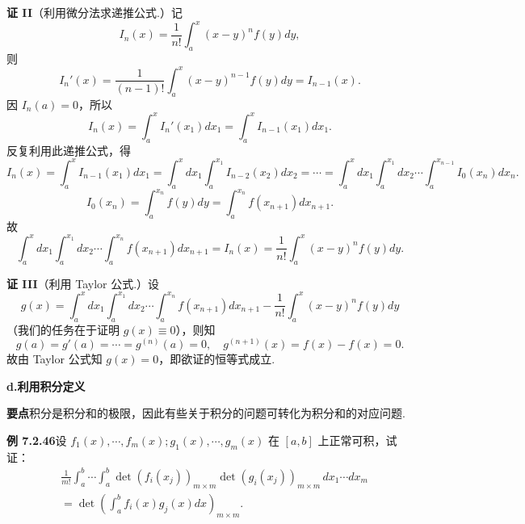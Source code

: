 \documentclass[UTF8, 12pt, fontset=fandol, oneside]{ctexart}
\begin{document}
\noindent\textbf{证 II}\quad （利用微分法求递推公式.）记
\[
I_n(x)=\frac1{n!}\int_a^x(x-y)^nf(y)dy,
\]
则
\[
I_n'(x)=\frac1{(n-1)!}\int_a^x(x-y)^{n-1}f(y)dy=I_{n-1}(x).
\]
因 $I_n(a)=0$，所以
\[
I_n(x)=\int_a^x I_n'(x_1)dx_1=\int_a^x I_{n-1}(x_1)dx_1.
\]
反复利用此递推公式，得
\[
I_n(x)=\int_a^x I_{n-1}(x_1)dx_1
=\int_a^x dx_1\int_a^{x_1}I_{n-2}(x_2)dx_2
=\cdots=\int_a^x dx_1\int_a^{x_1}dx_2\cdots
\int_a^{x_{n-1}}I_0(x_n)dx_n.
\]
\[
I_0(x_n)=\int_a^{x_n}f(y)dy=\int_a^{x_n}f(x_{n+1})dx_{n+1}.
\]
故
\[
\int_a^x dx_1\int_a^{x_1}dx_2\cdots\int_a^{x_n}f(x_{n+1})dx_{n+1}
=I_n(x)=\frac1{n!}\int_a^x(x-y)^nf(y)dy.
\]

\noindent\textbf{证 III}\quad （利用 Taylor 公式.）设
\[
g(x)=\int_a^x dx_1\int_a^{x_1}dx_2\cdots\int_a^{x_n}f(x_{n+1})dx_{n+1}
-\frac1{n!}\int_a^x(x-y)^nf(y)dy
\]
（我们的任务在于证明 $g(x)\equiv0$），则知
\[
g(a)=g'(a)=\cdots=g^{(n)}(a)=0,\quad g^{(n+1)}(x)=f(x)-f(x)=0.
\]
故由 Taylor 公式知 $g(x)=0$，即欲证的恒等式成立.

\noindent\textbf{d.\quad 利用积分定义}

\noindent\textbf{要点}\quad 积分是积分和的极限，因此有些关于积分的问题可转化为积分和的对应问题.

\noindent\textbf{例 7.2.46}\quad 设 $f_1(x),\cdots,f_m(x);g_1(x),\cdots,g_m(x)$ 在 $[a,b]$ 上正常可积，试证：
\[
\begin{aligned}
&\frac1{m!}\int_a^b\cdots\int_a^b
\det(f_i(x_j))_{m\times m}\det(g_i(x_j))_{m\times m}\,dx_1\cdots dx_m\\
&=\det\left(\int_a^b f_i(x)g_j(x)dx\right)_{m\times m}.
\end{aligned} \tag{1}
\]
\end{document}
